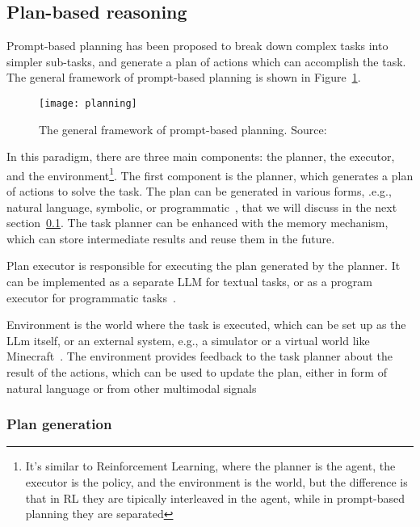 \subsection{Plan-based reasoning}
\label{subsec:plan-based}

Prompt-based planning has been proposed to break down complex tasks into simpler sub-tasks, and generate a plan of actions which can accomplish the task.
The general framework of prompt-based planning is shown in Figure~\ref{fig:planning}.

\begin{figure}[h!]
	\centering
	\texttt{[image: planning]}
	\caption{The general framework of prompt-based planning. Source: \textcite{survey}}
	\label{fig:planning}
\end{figure}

In this paradigm, there are three main components: the planner, the executor, and the environment\footnote{It's similar to Reinforcement Learning, where the planner is the agent, the executor is the policy, and the environment is the world, but the difference is that in RL they are tipically interleaved in the agent, while in prompt-based planning they are separated}.
The first component is the planner, which generates a plan of actions to solve the task.
The plan can be generated in various forms, .e.g., natural language, symbolic, or programmatic~\cite{gao2022pal, zhou2022least}, that we will discuss in the next section~\ref{subsec:plan-based}.
The task planner can be enhanced with the memory mechanism, which can store intermediate results and reuse them in the future.

Plan executor is responsible for executing the plan generated by the planner.
It can be implemented as a separate LLM for textual tasks, or as a program executor for programmatic tasks~\cite{wang2023plan, gao2022pal}.

Environment is the world where the task is executed, which can be set up as the LLm itself, or an external system, e.g., a simulator or a virtual world like Minecraft~\cite{yao2023tree, wang2023voyager}.
The environment provides feedback to the task planner about the result of the actions, which can be used to update the plan, either in form of natural language or from other multimodal signals~\cite{shinn2023reflexion, lu2023multimodal}

\subsubsection{Plan generation}
\label{subsubsec:plan-generation}

